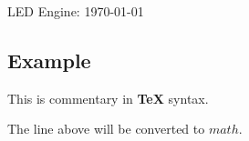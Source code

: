 \documentclass{led_doc}
\begin{document}
LED Engine: \today \hrulefill

\begin{ledCmnt}
\section{Example}
This is commentary in \textbf{TeX} syntax.
\end{ledCmnt}

\begin{ledDef}
\end{ledDef}

\begin{ledCmnt}
The line above will be converted to $math$.
\end{ledCmnt}
\end{document}
